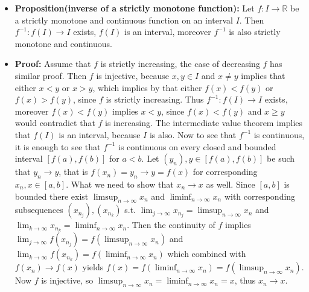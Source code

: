 \documentclass{article}
\begin{document}
\begin{itemize}
\item \textbf{Proposition(inverse of a strictly monotone function):} Let $f: I \to \mathbb{R}$ be a strictly monotone and continuous function on an interval $I$. Then $f^{-1}: f(I) \to I$ exists, $f(I)$ is an interval, moreover $f^{-1}$ is also strictly monotone and continuous.

\item \textbf{Proof:} Assume that $f$ is strictly increasing, the case of decreasing $f$ has similar proof. Then $f$ is injective, because $x, y \in I$ and $x \neq y$ implies that either $x < y$ or $x > y$, which implies by that either $f(x) < f(y)$ or $f(x) > f(y)$, since $f$ is strictly increasing. Thus $f^{-1}: f(I) \to I$ exists, moreover $f(x) < f(y)$ implies $x < y$, since $f(x) < f(y)$ and $x \geq y$ would contradict that $f$ is increasing. The intermediate value theorem implies that $f(I)$ is an interval, because $I$ is also. Now to see that $f^{-1}$ is continuous, it is enough to see that $f^{-1}$ is continuous on every closed and bounded interval $[f(a),f(b)]$ for $a < b$. Let $(y_n),y \in [f(a),f(b)]$ be such that $y_n \to y$, that is $f(x_n) = y_n \to y = f(x)$ for corresponding $x_n, x \in [a,b]$. What we need to show that $x_n \to x$ as well. Since $[a,b]$ is bounded there exist $\displaystyle \limsup_{n \to \infty} x_n$ and $\displaystyle \liminf_{n \to \infty} x_n$ with corresponding subsequences $(x_{n_j}), (x_{n_k})$ s.t. $\displaystyle \lim_{j \to \infty}x_{n_j} = \limsup_{n \to \infty}x_n$ and $\displaystyle \lim_{k \to \infty}x_{n_k} = \liminf_{n \to \infty}x_n$. Then the continuity of $f$ implies $\displaystyle \lim_{j \to \infty}f(x_{n_j}) = f(\limsup_{n \to \infty}x_n)$ and $\displaystyle \lim_{k \to \infty}f(x_{n_k}) = f(\liminf_{n \to \infty}x_n)$ which combined with $f(x_n) \to f(x)$ yields $\displaystyle f(x) = f(\liminf_{n \to \infty}x_n) = f(\limsup_{n \to \infty}x_n)$. Now $f$ is injective, so $\displaystyle \limsup_{n \to \infty}x_n = \liminf_{n \to \infty}x_n = x$, thus $x_n \to x$.
\end{itemize}
    
\end{document}
